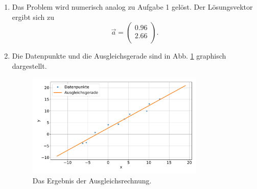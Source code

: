 \begin{enumerate}[label=\alph*)]
    \item Das Problem wird numerisch analog zu Aufgabe 1 gelöst. Der Lösungsvektor ergibt sich zu 
    \begin{equation*}
        \vec a = \begin{pmatrix}
            \num{0.96}\\
            \num{2.66}\\
        \end{pmatrix}.
    \end{equation*}

    \item   Die Datenpunkte und die Ausgleichsgerade sind in Abb. \ref{fig:ausgleich} graphisch dargestellt.
            \begin{figure}
                \centering
                \includegraphics[width=0.8\textwidth]{../bin/figure.pdf}
            \caption{Das Ergebnis der Ausgleichsrechnung.}
            \label{fig:ausgleich}
            \end{figure}
\end{enumerate}